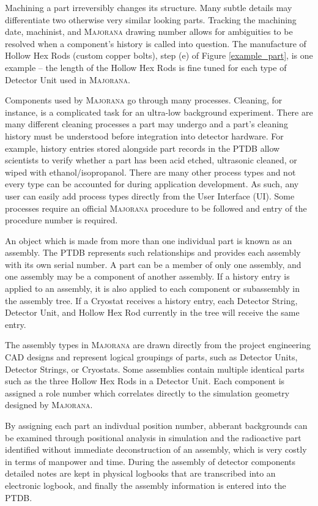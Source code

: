 \documentclass[journal]{IEEEtran}
\begin{document}
Machining a part irreversibly changes its structure. Many subtle details may differentiate
two otherwise very similar looking parts. Tracking the machining date, machinist, and \textsc{Majorana} drawing number allows
for ambiguities to be resolved when a component's history is called into question. The manufacture of Hollow Hex Rods (custom copper bolts), step (e) of Figure \ref{example_part},
is one example -- the length of the Hollow Hex Rods is fine tuned for each type of Detector Unit used in \textsc{Majorana}.

Components used by \textsc{Majorana} go through many processes. Cleaning, for instance, is a complicated task for an ultra-low
background experiment. There are many different cleaning processes a part may undergo and a part's cleaning history
must be understood before integration into detector hardware. For example, history entries stored alongside part records in the PTDB
allow scientists to verify whether a part has been acid etched, ultrasonic cleaned, or wiped with ethanol/isopropanol.
There are many other process types and not every type can be accounted for during application development. As such, any user can 
easily add process types directly from the User Interface (UI). Some processes require an official \textsc{Majorana} procedure to be
followed and entry of the procedure number is required.

An object which is made from more than one individual
part is known as an assembly. The PTDB represents such relationships and provides each assembly with its own serial number. A part can be a member of only one assembly,
and one assembly may be a component of another assembly.
If a history entry is applied to an assembly, it is also applied to each component or sub\-assembly in the assembly tree. If a Cryostat receives
a history entry, each Detector String, Detector Unit, and Hollow Hex Rod currently in the tree will receive the same entry.

The assembly types in \textsc{Majorana} are drawn directly from the project engineering CAD designs and represent logical 
groupings of parts, such as Detector Units, Detector Strings, or Cryostats. 
Some assemblies contain multiple identical parts such as the three Hollow Hex Rods in a Detector Unit.
Each component is assigned a role number which correlates directly to the simulation geometry designed by \textsc{Majorana}. 

By assigning each part an indivdual position number, abberant backgrounds can be examined through positional analysis in 
simulation and the radioactive part identified without immediate deconstruction of an assembly, which is very costly in 
terms of manpower and time. During the assembly of detector components detailed notes are kept in physical logbooks that are
transcribed into an electronic logbook, and finally the assembly information is entered into the PTDB.
\end{document}
